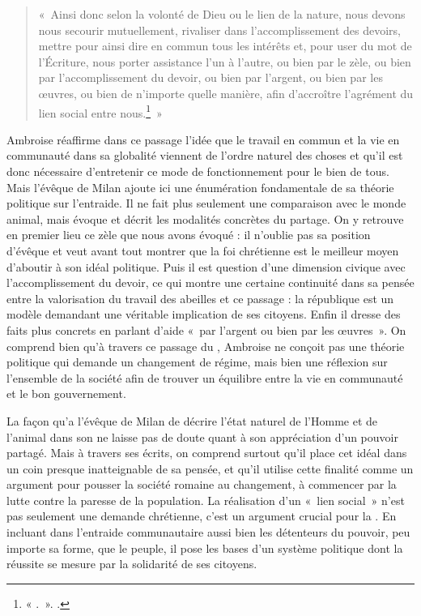 \bigskip

\begin{quote}
 «~Ainsi donc selon la volonté de Dieu ou le lien de la nature, nous devons nous secourir mutuellement, rivaliser dans l’accomplissement des devoirs, mettre pour ainsi dire en commun tous les intérêts et, pour user du mot de l’Écriture, nous porter assistance l’un à l’autre, ou bien par le zèle, ou bien par l’accomplissement du devoir, ou bien par l’argent, ou bien par les œuvres, ou bien de n’importe quelle manière, afin d’accroître l’agrément du lien social entre nous.\footnote{« .~». \cite[\nopp I, 135]{ambroise_devoirs_1}.}~»
\end{quote}

\bigskip

Ambroise réaffirme dans ce passage l'idée que le travail en commun et la vie en communauté dans sa globalité viennent de l'ordre naturel des choses et qu'il est donc nécessaire d'entretenir ce mode de fonctionnement pour le bien de tous. Mais l'évêque de Milan ajoute ici une énumération fondamentale de sa théorie politique sur l'entraide. Il ne fait plus seulement une comparaison avec le monde animal, mais évoque et décrit les modalités concrètes du partage. On y retrouve en premier lieu ce zèle que nous avons évoqué : il n'oublie pas sa position d'évêque et veut avant tout montrer que la foi chrétienne est le meilleur moyen d'aboutir à son idéal politique. Puis il est question d'une dimension civique avec l'accomplissement du devoir, ce qui montre une certaine continuité dans sa pensée entre la valorisation du travail des abeilles et ce passage : la république est un modèle demandant une véritable implication de ses citoyens. Enfin il dresse des faits plus concrets en parlant d'aide «~par l'argent ou bien par les œuvres~». On comprend bien qu'à travers ce passage du , Ambroise ne conçoit pas une théorie politique qui demande un changement de régime, mais bien une réflexion sur l'ensemble de la société afin de trouver un équilibre entre la vie en communauté et le bon gouvernement.

\bigskip

La façon qu'a l'évêque de Milan de décrire l'état naturel de l'Homme et de l'animal dans son  ne laisse pas de doute quant à son appréciation d'un pouvoir partagé. Mais à travers ses écrits, on comprend surtout qu'il place cet idéal dans un coin presque inatteignable de sa pensée, et qu'il utilise cette finalité comme un argument pour pousser la société romaine au changement, à commencer par la lutte contre la paresse de la population. La réalisation d'un «~lien social~» n'est pas seulement une demande chrétienne, c'est un argument crucial pour la . En incluant dans l'entraide communautaire aussi bien les détenteurs du pouvoir, peu importe sa forme, que le peuple, il pose les bases d'un système politique dont la réussite se mesure par la solidarité de ses citoyens.

